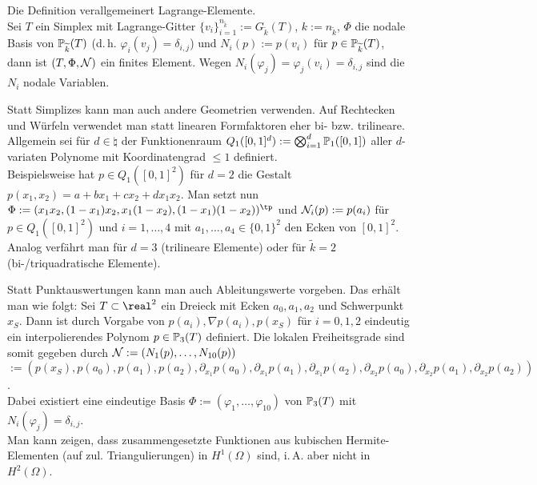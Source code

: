\linie

\begin{Bem}
    Die Definition verallgemeinert Lagrange-Elemente.\\
    Sei $T$ ein Simplex mit Lagrange-Gitter
    $\{v_i\}_{i=1}^{n_{\widetilde{k}}} := G_{\widetilde{k}}(T)$,
    $k := n_{\widetilde{k}}$,
    $\Phi$ die nodale Basis von $\mathbb{P}_{\widetilde{k}}(T)$ (d.\,h. $\varphi_i(v_j) = \delta_{i,j}$)
    und $N_i(p) := p(v_i)$ für $p \in \mathbb{P}_{\widetilde{k}}(T)$,
    dann ist $(T, \Phi, \mathcal{N})$ ein finites Element.
    Wegen $N_i(\varphi_j) = \varphi_j(v_i) = \delta_{i,j}$ sind die $N_i$ nodale Variablen.
\end{Bem}

\linie

\begin{Bem}
    Statt Simplizes kann man auch andere Geometrien verwenden.
    Auf Rechtecken und Würfeln verwendet man statt linearen Formfaktoren
    eher bi- bzw. trilineare.\\
    Allgemein sei für $d \in \natural$ der Funktionenraum
    $Q_1([0,1]^d) := \bigotimes_{i=1}^d \mathbb{P}_1([0,1])$ aller $d$-variaten Polynome
    mit Koordinatengrad $\le 1$ definiert.\\
    Beispielsweise hat $p \in Q_1([0,1]^2)$ für $d = 2$
    die Gestalt $p(x_1, x_2) = a + bx_1 + cx_2 + dx_1 x_2$.
    Man setzt nun $\Phi := (x_1 x_2, (1-x_1)x_2, x_1(1-x_2), (1-x_1)(1-x_2))^\tp$
    und $\mathcal{N}_i(p) := p(a_i)$ für $p \in Q_1([0,1]^2)$ und $i = 1, \dotsc, 4$ mit
    $a_1, \dotsc, a_4 \in \{0, 1\}^2$ den Ecken von $[0, 1]^2$.\\
    Analog verfährt man für $d = 3$ (trilineare Elemente) oder
    für $\widetilde{k} = 2$ (bi-/triquadratische Elemente).
\end{Bem}

\linie

\begin{Bem}
    Statt Punktauswertungen kann man auch Ableitungswerte vorgeben.
    Das  erhält man wie folgt:
    Sei $T \subset \real^2$ ein Dreieck mit Ecken $a_0, a_1, a_2$ und Schwerpunkt $x_S$.
    Dann ist durch Vorgabe von $p(a_i), \nabla p(a_i), p(x_S)$ für $i = 0, 1, 2$
    eindeutig ein interpolierendes Polynom $p \in \mathbb{P}_3(T)$ definiert.
    Die lokalen Freiheitsgrade sind somit gegeben durch
    $\mathcal{N} := (N_1(p), \dotsc, N_{10}(p))$\\
    $:= (p(x_S), p(a_0), p(a_1), p(a_2), \partial_{x_1} p(a_0), \partial_{x_1} p(a_1),
    \partial_{x_1} p(a_2), \partial_{x_2} p(a_0), \partial_{x_2} p(a_1), \partial_{x_2} p(a_2))$.\\
    Dabei existiert eine eindeutige Basis $\Phi := (\varphi_1, \dotsc, \varphi_{10})$ von
    $\mathbb{P}_3(T)$ mit $N_i(\varphi_j) = \delta_{i,j}$.\\
    Man kann zeigen, dass zusammengesetzte Funktionen aus kubischen Hermite-Elementen
    (auf zul. Triangulierungen) in $H^1(\Omega)$ sind, i.\,A. aber nicht in $H^2(\Omega)$.
\end{Bem}

